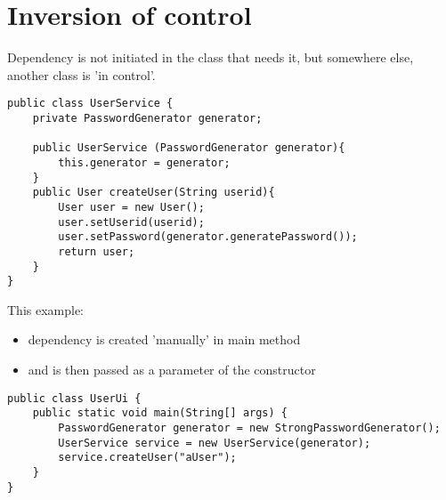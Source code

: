 \section{Inversion of control}

Dependency is not initiated in the class that needs it, but somewhere else, another class is 'in control’.

\begin{verbatim}
public class UserService {
	private PasswordGenerator generator;
		
	public UserService (PasswordGenerator generator){
		this.generator = generator;
	}
	public User createUser(String userid){
		User user = new User();
		user.setUserid(userid);
		user.setPassword(generator.generatePassword());
		return user;
	}
}
\end{verbatim}

This example:
\begin{itemize}
	
	\item dependency is created 'manually’ in main method
	\item and is then passed as a parameter of the constructor
\end{itemize}

\begin{verbatim}
public class UserUi {
	public static void main(String[] args) {
		PasswordGenerator generator = new StrongPasswordGenerator();
		UserService service = new UserService(generator);
		service.createUser("aUser");
	}
}
\end{verbatim}